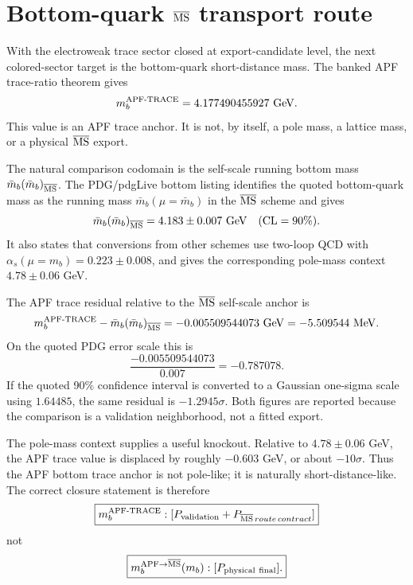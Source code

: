\section{Bottom-quark \texorpdfstring{$\overline{\rm MS}$}{MSbar} transport route}
\label{sec:bottom-msbar-transport-v23}

With the electroweak trace sector closed at export-candidate level, the next
colored-sector target is the bottom-quark short-distance mass.  The banked APF
trace-ratio theorem gives
\begin{equation}
  m_b^{\rm APF\text{-}TRACE}=4.177490455927\ {\rm GeV}.
\end{equation}
This value is an APF trace anchor.  It is not, by itself, a pole mass, a lattice
mass, or a physical \(\overline{\rm MS}\) export.

The natural comparison codomain is the self-scale running bottom mass
\(\bar m_b(\bar m_b)_{\overline{\rm MS}}\).  The PDG/pdgLive bottom listing
identifies the quoted bottom-quark mass as the running mass
\(\bar m_b(\mu=\bar m_b)\) in the \(\overline{\rm MS}\) scheme and gives
\begin{equation}
  \bar m_b(\bar m_b)_{\overline{\rm MS}}
  =4.183\pm0.007\ {\rm GeV}\quad ({\rm CL}=90\%).
\end{equation}
It also states that conversions from other schemes use two-loop QCD with
\(\alpha_s(\mu=m_b)=0.223\pm0.008\), and gives the corresponding pole-mass
context \(4.78\pm0.06\) GeV.\cite{PDG2025BottomQuarkMass}

The APF trace residual relative to the \(\overline{\rm MS}\) self-scale anchor is
\begin{equation}
  m_b^{\rm APF\text{-}TRACE}
  -\bar m_b(\bar m_b)_{\overline{\rm MS}}
  =-0.005509544073\ {\rm GeV}
  =-5.509544\ {\rm MeV}.
\end{equation}
On the quoted PDG error scale this is
\begin{equation}
  \frac{-0.005509544073}{0.007}=-0.787078.
\end{equation}
If the quoted 90\% confidence interval is converted to a Gaussian one-sigma
scale using \(1.64485\), the same residual is \(-1.2945\sigma\).  Both figures
are reported because the comparison is a validation neighborhood, not a fitted
export.

The pole-mass context supplies a useful knockout.  Relative to \(4.78\pm0.06\)
GeV, the APF trace value is displaced by roughly \(-0.603\) GeV, or about
\(-10\sigma\).  Thus the APF bottom trace anchor is not pole-like; it is naturally
short-distance-like.  The correct closure statement is therefore
\begin{equation}
\boxed{
  m_b^{\rm APF\text{-}TRACE}:
  [P_{\rm validation}+P_{\overline{\rm MS}\,route\,contract}]
}
\end{equation}
not
\begin{equation}
\boxed{
  m_b^{\rm APF\to\overline{MS}}(m_b):[P_{\rm physical\ final}].
}
\end{equation}

